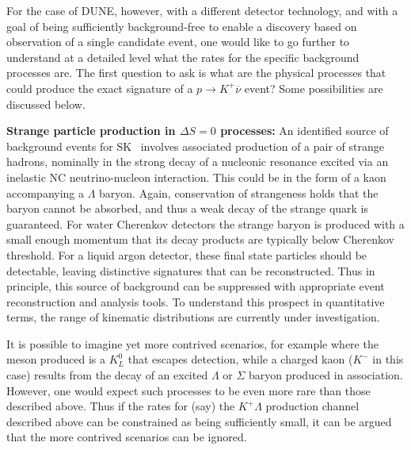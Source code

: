 For the case of DUNE, however, with a different detector 
technology, and with a goal of being sufficiently background-free 
to enable a discovery based on observation of a single candidate  
event, one would like to go further to understand at a detailed 
level what the rates for the specific background processes are. 
The first question to ask is 
what are the physical processes that could 
produce the exact signature of a $p\to K^+\overline{\nu}$ 
event?  Some possibilities are discussed below.  

\textbf{{\boldmath Strange particle production in $\Delta S = 0$ processes:}}
An identified source of background events 
for SK~\cite{Kobayashi:2005pe}
involves associated production of 
a pair of strange hadrons, nominally in the strong decay of a
nucleonic resonance excited 
via an inelastic NC
neutrino-nucleon interaction.  This could be in the form of a kaon 
accompanying a $\Lambda$ baryon.  Again, conservation of 
strangeness holds that the baryon cannot be absorbed, and thus a 
weak decay of the strange quark is guaranteed.  For water Cherenkov 
detectors the strange baryon is produced with a small enough 
momentum that its decay products are typically below Cherenkov 
threshold.  For a liquid argon detector, these final state particles 
should be detectable, leaving distinctive signatures that can be 
reconstructed.  Thus in principle, this source of background 
can be suppressed with appropriate event reconstruction and analysis 
tools.   To understand this prospect in quantitative terms, the range of kinematic 
distributions are currently under investigation.

It is possible to imagine yet more contrived scenarios, for example where 
the meson produced is a $K^0_L$ that escapes detection, while a
charged kaon ($K^-$ in this case) results from the decay of an 
excited $\Lambda$ or $\Sigma$ baryon produced in association.
However, one would expect such processes to be even more rare than 
those described above.  Thus if the rates for (say) the $K^+\Lambda$ 
production channel described above can be constrained as being sufficiently 
small, it can be argued that the more contrived scenarios can be ignored.


